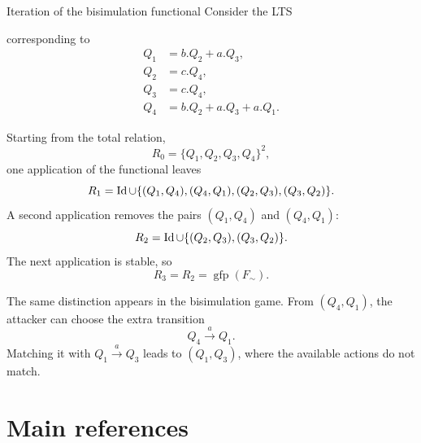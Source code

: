 \documentclass[a4paper]{article}
\newcommand{\Id}{\operatorname{Id}}
\newcommand{\trans}[1]{\xrightarrow{#1}}
\newcommand{\gfp}{\operatorname{gfp}}
\begin{document}
\begin{snippetexample}{Iteration of the bisimulation functional}
    Consider the LTS
    \begin{center}
    \end{center}
    corresponding to
    \begin{align*}
        Q_1 &= b.Q_2+a.Q_3,\\
        Q_2 &= c.Q_4,\\
        Q_3 &= c.Q_4,\\
        Q_4 &= b.Q_2+a.Q_3+a.Q_1.
    \end{align*}

    Starting from the total relation,
    \[
        R_0=\{Q_1,Q_2,Q_3,Q_4\}^2,
    \]
    one application of the functional leaves
    \[
        R_1
        =
        \Id
        \union
        \{(Q_1,Q_4),(Q_4,Q_1),(Q_2,Q_3),(Q_3,Q_2)\}.
    \]
    A second application removes the pairs \((Q_1,Q_4)\) and \((Q_4,Q_1)\):
    \[
        R_2
        =
        \Id
        \union
        \{(Q_2,Q_3),(Q_3,Q_2)\}.
    \]
    The next application is stable, so
    \[
        R_3=R_2=\gfp(F_{\sim}).
    \]

    The same distinction appears in the bisimulation game.
    From \((Q_4,Q_1)\), the attacker can choose the extra transition
    \[
        Q_4\trans{a}Q_1.
    \]
    Matching it with \(Q_1\trans{a}Q_3\) leads to \((Q_1,Q_3)\), where the available actions do not match.
\end{snippetexample}

\pagebreak

\section{Main references}
\end{document}
